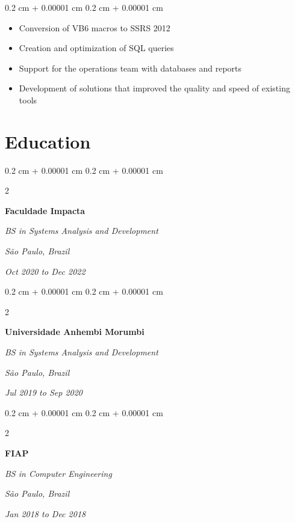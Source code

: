 \documentclass[10pt, a4paper]{article}
\newenvironment{highlights}{
    \begin{itemize}[
        topsep=0.10 cm,
        parsep=0.10 cm,
        partopsep=0pt,
        itemsep=0pt,
        leftmargin=0.4 cm + 10pt
    ]
}{
    \end{itemize}
} %
\newenvironment{onecolentry}{
    \begin{adjustwidth}{
        0.2 cm + 0.00001 cm
    }{
        0.2 cm + 0.00001 cm
    }
}{
    \end{adjustwidth}
} %
\newenvironment{twocolentry}[2][]{
    \onecolentry
    \def\secondColumn{#2}
    \setcolumnwidth{\fill, 7 cm}
    \begin{paracol}{2}
}{
    \switchcolumn \raggedleft \secondColumn
    \end{paracol}
    \endonecolentry
} %
\begin{document}
        \vspace{0.10 cm}
        \begin{onecolentry}
            \begin{highlights}
                \item Conversion of VB6 macros to SSRS 2012
                \item Creation and optimization of SQL queries
                \item Support for the operations team with databases and reports
                \item Development of solutions that improved the quality and speed of existing tools
            \end{highlights}
        \end{onecolentry}



    
    \section{Education}



        
        \begin{twocolentry}{
        \textit{São Paulo, Brazil}    
            
        \textit{Oct 2020 to Dec 2022}}
            \textbf{Faculdade Impacta}

            \textit{BS in Systems Analysis and Development}
        \end{twocolentry}



        \vspace{0.2 cm}

        \begin{twocolentry}{
        \textit{São Paulo, Brazil}    
            
        \textit{Jul 2019 to Sep 2020}}
            \textbf{Universidade Anhembi Morumbi}

            \textit{BS in Systems Analysis and Development}
        \end{twocolentry}



        \vspace{0.2 cm}

        \begin{twocolentry}{
        \textit{São Paulo, Brazil}    
            
        \textit{Jan 2018 to Dec 2018}}
            \textbf{FIAP}

            \textit{BS in Computer Engineering}
        \end{twocolentry}
\end{document}

